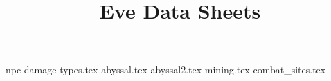 
\title{Eve Data Sheets}
\author{}
\date{}

\maketitle
\newpage
\tableofcontents
\newpage
\small
{npc-damage-types.tex}
\newpage
{abyssal.tex}
\newpage
{abyssal2.tex}
\newpage
{mining.tex}
\newpage
{combat_sites.tex}
%
%
%
%
%



